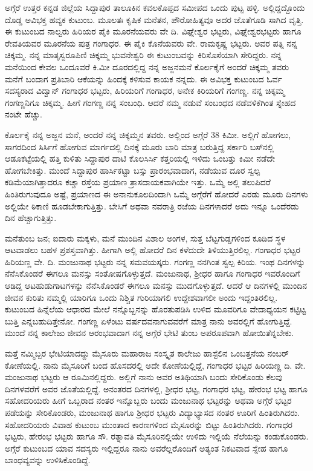 {ಅಗ್ಗೆರೆ ಉತ್ತರ ಕನ್ನಡ ಜಿಲ್ಲೆಯ ಸಿದ್ದಾಪುರ ತಾಲೂಕಿನ ಕವಲಕೊಪ್ಪದ ಸಮೀಪದ ಒಂದು ಪುಟ್ಟ ಹಳ್ಳಿ.  ಅಲ್ಲಿದ್ದದ್ದೊಂದು ದೊಡ್ಡ ಅವಿಭಕ್ತ ಹವ್ಯಕ ಕುಟುಂಬ.  ಮೂಲತಃ ಕೃಷಿಕ ಮನೆತನ, ಪೌರೋಹಿತ್ಯವೂ ಅದರ ಜೊತೆಗೂಡಿ ಸಾಗಿದ ವೃತ್ತಿ.  ಈ ಕುಟುಂಬದ ನಾಲ್ವರು ಹಿರಿಯರ ಪೈಕಿ ಮೂರನೆಯವರು ವೇ ದಿ. ವಿಘ್ನೇಶ್ವರ ಭಟ್ಟರು,  ವಿಘ್ನೇಶ್ವರಭಟ್ಟರು ಹಾಗೂ ರೇವತಿಯವರ ಮೂರನೆಯ ಪುತ್ರ ಗಂಗಾಧರ.  ಈ ಪೈಕಿ ಕೊನೆಯವರು ವೇ. ರಾಮಕೃಷ್ಣ ಭಟ್ಟರು.  ಅವರ ಪತ್ನಿ ನನ್ನ ಚಿಕ್ಕಮ್ಮ.  ನನ್ನ ಮಾತೃ\-ಸ್ವರೂಪಿಣಿ ಚಿಕ್ಕಮ್ಮ ಭುವನೇಶ್ವರಿ ಈ ಕುಟುಂಬವನ್ನು ಕಿರಿಸೊಸೆಯಾಗಿ ಸೇರಿದ್ದರು.  ನನ್ನ ಮನೆಯಿಂದ ಕೇವಲ ಒಂದೂವರೆ ಕಿ.ಮೀ ದೂರದಲ್ಲಿದ್ದ ನನ್ನ ಅಜ್ಜನಮನೆ ಕೊರ್ಲಕೈಗೆ ಅಂದರೆ ಚಿಕ್ಕಮ್ಮ ತವರು ಮನೆಗೆ ಬಂದಾಗ ಪ್ರತಿಬಾರಿ ಆಕೆಯನ್ನು ಹಿಂದಕ್ಕೆ ಕಳಿಸುವ ಕಾಯಕ ನನ್ನದು.  ಈ ಅವಿಭಕ್ತ ಕುಟುಂಬದ ಓರ್ವ ಸದಸ್ಯರಾದ ವಿದ್ವಾನ್ ಗಂಗಾಧರ ಭಟ್ಟರು, ಹಿರಿಯರಿಗೆ ಗಂಗಾಧರ, ಅನೇಕ ಕಿರಿಯರಿಗೆ ಗಂಗಣ್ಣ.  ನನ್ನ ಚಿಕ್ಕಮ್ಮ ಗಂಗಣ್ಣನಿಗೂ ಚಿಕ್ಕಮ್ಮ.  ಹೀಗೆ ಗಂಗಣ್ಣ ನನ್ನ ಸಂಬಂಧಿ.  ಆದರೆ ನಮ್ಮ ನಡುವೆ ಸಂಬಂಧದ ನಡೆವಳಿಕೆಗಿಂತ ಸ್ನೇಹದ ನಂಟೇ ಹೆಚ್ಚು. 

ಕೊರ್ಲಕೈ ನನ್ನ ಅಜ್ಜನ ಮನೆ, ಅಂದರೆ ನನ್ನ ಚಿಕ್ಕಮ್ಮನ ತವರು.  ಅಲ್ಲಿಂದ ಅಗ್ಗೆರೆ 38 ಕಿಮೀ.  ಅಲ್ಲಿಗೆ ಹೋಗಲು, ಸಾಗರದಿಂದ ಸಿರ್ಸಿಗೆ ಹೋಗುವ ಮಾರ್ಗದಲ್ಲಿ ದಿನಕ್ಕೆ ಮೂರು ಬಾರಿ ಮಾತ್ರ ಬರುತ್ತಿದ್ದ ಸರ್ಕಾರಿ ಬಸ್‍ನಲ್ಲಿ ಆಡೂಕಟ್ಟೆಯಲ್ಲಿ ಹತ್ತಿ ಕುಳಿತು ಸಿದ್ದಾಪುರ ದಾಟಿ ಕೊಲಸಿರ್ಸಿ ಕತ್ತರಿಯಲ್ಲಿ ಇಳಿದು ಒಂಬತ್ತು ಕಿಮೀ ನಡೆದೇ ಹೋಗ\-ಬೇಕಿತ್ತು.  ಮುಂದೆ ಸಿದ್ದಾಪುರ ಹಾರ್ಸಿಕಟ್ಟಾ ಬಸ್ಸು ಪ್ರಾರಂಭವಾದಾಗ, ನಡೆಯುವ ದೂರ ಸ್ವಲ್ಪ ಕಡಿಮೆಯಾಗಿತ್ತಾದರೂ ಕಚ್ಚಾ ರಸ್ತೆಯ ಪ್ರಯಾಣ ತ್ರಾಸದಾಯಕವಾಗಿಯೇ ಇತ್ತು.  ಒಮ್ಮೆ ಅಲ್ಲಿ ತಲುಪಿದರೆ ಹಿಂತಿರುಗುವುದೂ ಅಷ್ಟೆ, ಪ್ರಯಾಣದ ಈ ಅನಾನು\-ಕೂಲದಿಂದಾಗಿ ಒಮ್ಮೆ ಅಗ್ಗೆರೆಗೆ ಹೋದರೆ ಎರಡು ಮೂರು ದಿನಗಳು ಅಲ್ಲಿಯೇ ಠಿಕಾಣಿ ಹೂಡಬೇಕಾಗುತ್ತಿತ್ತು.  ಬೇಸಿಗೆ ಅಥವಾ ನವರಾತ್ರಿ ರಜೆಯ ದಿನಗಳಾದರೆ ಅದು ಇನ್ನೂ ಒಂದೆರಡು ದಿನ ಹೆಚ್ಚಾಗುತ್ತಿತ್ತು.  

ಮನೆತುಂಬ ಜನ; ಐದಾರು ಮಕ್ಕಳು, ಮನೆ ಮುಂದಿನ ವಿಶಾಲ ಅಂಗಳ, ಸುತ್ತ ಬೆಟ್ಟಗುಡ್ಡಗಳಿಂದ ಕೂಡಿದ ಸ್ಥಳ ಆಟವಾಡಲು ಬಹಳ ಪ್ರಶಸ್ತವಾಗಿತ್ತು.  ಹೀಗಾಗಿ ಅಲ್ಲಿ ಹೋದರೆ ದಿನ ಕಳೆದುದೇ ತಿಳಿಯುತ್ತಿರಲಿಲ್ಲ.  ಗಂಗಾಧರ ಭಟ್ಟರ ಹಿರಿಯಣ್ಣ ವೇ. ದಿ. ಮಂಜುನಾಥ ಭಟ್ಟರು ನನ್ನ ಸಮವಯಸ್ಕರು.  ಗಂಗಣ್ಣ ನನಗಿಂತ ಸ್ವಲ್ಪ ಕಿರಿಯ.  ಇಂಥ ದಿನಗಳನ್ನು ನೆನೆಸಿ\-ಕೊಂಡರೆ ಈಗಲೂ ಮನಸ್ಸು ಸಂತೋಷಗೊಳ್ಳುತ್ತದೆ.  ಮಂಜುನಾಥ, ಶ್ರೀಧರ ಹಾಗೂ ಗಂಗಾಧರ ಇವರೊಂದಿಗೆ ಆಡಿದ್ದ ಆಟ\enginline{-}ಹುಡುಗಾಟಗಳನ್ನು ನೆನೆಸಿ\-ಕೊಂಡರೆ ಈಗಲೂ ಮನಸ್ಸು ಮುದಗೊಳ್ಳುತ್ತದೆ.  ಆದರೆ ಆ ದಿನಗಳಲ್ಲಿ ಮುಂದಿನ ಜೀವನ ಕುರಿತು ನಮ್ಮಲ್ಲಿ ಯಾರಿಗೂ ಒಂದು ನಿಶ್ಚಿತ ಗುರಿಯಾಗಲಿ ಉದ್ದೇಶ\-ವಾಗಲೀ ಅಂದು ಇದ್ದಂತಿರಲಿಲ್ಲ.  ಕುಟುಂಬದ ಹಿನ್ನೆಲೆಯ ಆಧಾರದ ಮೇಲೆ ನನ್ನೊಬ್ಬನನ್ನು ಹೊರತುಪಡಿಸಿ ಉಳಿದ ಮೂವರಿಗೂ ವೇದಾಧ್ಯಯನ ಕಟ್ಟಿಟ್ಟ ಬುತ್ತಿ ಎನ್ನಬಹು\-ದಿತ್ತೇನೋ.  ಗಂಗಣ್ಣ ಏಳೆಂಟು ವರ್ಷದವನಾಗುವವರೆಗೆ ಮಾತ್ರ ನಾನು ಅವರಲ್ಲಿಗೆ ಹೋಗುತ್ತಿದ್ದೆ.  ಮುಂದೆ ನನ್ನ ಕಾಲೇಜು ಜೀವನ ಆರಂಭವಾದಾಗ ನನ್ನ ಅಗ್ಗೆರೆ ಭೇಟಿ ತುಂಬ ಅಪರೂಪವಾಗಿ ಹೋಯಿತೆನ್ನಬೇಕು. 

ಮತ್ತೆ ನಮ್ಮಿಬ್ಬರ ಭೇಟಿಯಾದದ್ದು ಮೈಸೂರು ಮಹಾರಾಜ ಸಂಸ್ಕೃತ ಕಾಲೇಜು ಹಾಸ್ಟೆಲಿನ ಒಂಬತ್ತನೆಯ ನಂಬರ್ ಕೋಣೆಯಲ್ಲಿ.  ನಾನು ಮೈಸೂರಿಗೆ ಬಂದ ಹೊಸದರಲ್ಲಿ ಅದೇ ಕೋಣೆಯಲ್ಲಿದ್ದೆ, ಗಂಗಾಧರ ಭಟ್ಟರ ಹಿರಿಯಣ್ಣ ದಿ. ವೇ. ಮಂಜುನಾಥ ಭಟ್ಟರು ಆ ರೂಮಿನಲ್ಲಿದ್ದರು.  ಅಲ್ಲಿಗೆ ನಾನು ಅವರ ಅತಿಥಿಯಾಗಿ ಬಂದು ಸೇರಿಕೊಂಡು ಕೆಲವು ದಿನಗಳವರೆಗೆ ಅವರ ಜೊತೆಯಲ್ಲಿದ್ದೆ.  ಅನಂತರದ ದಿನಗಳಲ್ಲಿ, ಶ್ರೀಧರ ಭಟ್ಟ, ಗಂಗಾಧರ ಭಟ್ಟ, ಹೇರಂಭ ಭಟ್ಟ ಹಾಗೂ ಸಹೋದರಿಯರು ಹೀಗೆ ಒಬ್ಬರಾದ ನಂತರ ಇನ್ನೊಬ್ಬರು ಬಂದು ಮಂಜುನಾಥ ಭಟ್ಟರನ್ನು ಅಥವಾ ಅಗ್ಗೆರೆ ಭಟ್ಟರ ಪಡೆಯನ್ನು ಸೇರಿಕೊಂಡರು,  ಮಂಜುನಾಥ ಹಾಗೂ ಶ್ರೀಧರ ಭಟ್ಟರು ವಿದ್ಯಾಭ್ಯಾಸದ ನಂತರ ಊರಿಗೆ ಹಿಂತಿರುಗಿದರು.  ಸಹೋದರಿಯರು ವಿವಾಹ  \enginline{-}  ಕುಟುಂಬ ಮುಂತಾದ ಕಾರಣಗಳಿಂದ ಮೈಸೂರನ್ನು ಬಿಟ್ಟು ಹಿಂತಿರುಗಿದರು.  ಗಂಗಾಧರ ಭಟ್ಟರು, ಹೇರಂಭ ಭಟ್ಟರು ಹಾಗೂ ಸೌ. ರತ್ನಾವತಿ ಮೈಸೂರಿನಲ್ಲಿಯೇ ಉಳಿದು ಇಲ್ಲಿಯೆ ನೆಲೆಯನ್ನು ಕಂಡುಕೊಂಡರು.  ಅಗ್ಗೆರೆ ಕುಟುಂಬದ ಯಾವ ಸದಸ್ಯರು ಇಲ್ಲಿದ್ದರೂ ನಾನು ಅವರೆಲ್ಲರೊಂದಿಗೆ ಅತ್ಯಂತ ನಿಕಟವಾದ ಸ್ನೇಹ ಹಾಗೂ ಬಾಂಧವ್ಯವನ್ನು ಉಳಿಸಿಕೊಂಡಿದ್ದೆ.  

}
